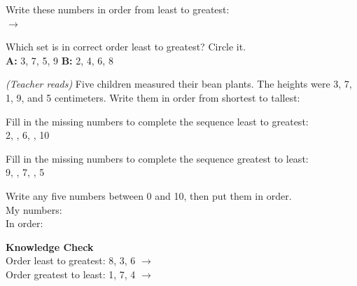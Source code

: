 \documentclass[12pt,letterpaper]{article}
\begin{document}
\vspace{10pt}
\prob Write these numbers in order from least to greatest:\\[6pt]
\hspace{1cm}{\Large 9 \quad 0 \quad 6 \quad 4 \quad 2 \quad 7} \quad$\longrightarrow$\quad
\ansblank\quad\ansblank\quad\ansblank\quad\ansblank\quad\ansblank\quad\ansblank

\vspace{10pt}
\prob Which set is in correct order least to greatest? Circle it.\\[6pt]
\hspace{1cm}\textbf{A:} 3, 7, 5, 9 \hspace{2cm} \textbf{B:} 2, 4, 6, 8

\vspace{10pt}
\prob \textit{(Teacher reads)} Five children measured their bean plants.
The heights were 3, 7, 1, 9, and 5 centimeters.
Write them in order from shortest to tallest:\\[6pt]
\hspace{1cm}\ansblank\quad\ansblank\quad\ansblank\quad\ansblank\quad\ansblank

\vspace{10pt}
\prob Fill in the missing numbers to complete the sequence least to greatest:\\[6pt]
\hspace{1cm}2, \ansblank, 6, \ansblank, 10

\vspace{10pt}
\prob Fill in the missing numbers to complete the sequence greatest to least:\\[6pt]
\hspace{1cm}9, \ansblank, 7, \ansblank, 5

\vspace{10pt}
\prob Write any five numbers between 0 and 10, then put them in order.\\[6pt]
My numbers: \ansblank\quad\ansblank\quad\ansblank\quad\ansblank\quad\ansblank\\[6pt]
In order: \ansblank\quad\ansblank\quad\ansblank\quad\ansblank\quad\ansblank

\goldrule

\begin{checkbox}
\noindent\textbf{\color{sd-green}Knowledge Check}\\[4pt]
\setcounter{probnum}{0}
\prob Order least to greatest: 8, 3, 6 \quad$\longrightarrow$\quad\ansblank\quad\ansblank\quad\ansblank\\[8pt]
\prob Order greatest to least: 1, 7, 4 \quad$\longrightarrow$\quad\ansblank\quad\ansblank\quad\ansblank
\end{checkbox}
\end{document}
